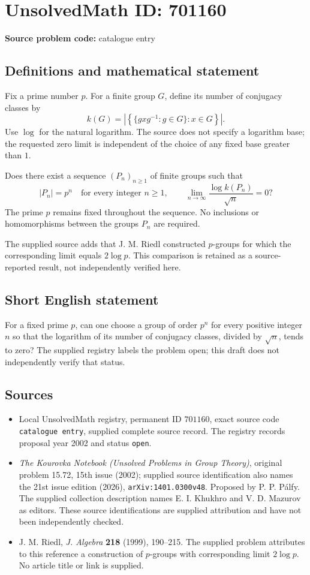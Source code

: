 \documentclass[11pt]{article}
\begin{document}
\section*{UnsolvedMath ID: 701160}
\textbf{Source problem code:} catalogue entry
\subsection{Definitions and mathematical statement}
Fix a prime number \(p\). For a finite group \(G\), define its number of conjugacy classes by
\[
k(G)=\left|\left\{\{gxg^{-1}:g\in G\}:x\in G\right\}\right|.
\]
Use \(\log\) for the natural logarithm. The source does not specify a logarithm base; the requested zero limit is independent of the choice of any fixed base greater than \(1\).

Does there exist a sequence \((P_n)_{n\geq 1}\) of finite groups such that
\[
|P_n|=p^n\quad\text{for every integer }n\geq 1,
\qquad
\lim_{n\to\infty}\frac{\log k(P_n)}{\sqrt n}=0?
\]
The prime \(p\) remains fixed throughout the sequence. No inclusions or homomorphisms between the groups \(P_n\) are required.

The supplied source adds that J. M. Riedl constructed \(p\)-groups for which the corresponding limit equals \(2\log p\). This comparison is retained as a source-reported result, not independently verified here.
\subsection{Short English statement}
For a fixed prime \(p\), can one choose a group of order \(p^n\) for every positive integer \(n\) so that the logarithm of its number of conjugacy classes, divided by \(\sqrt n\), tends to zero? The supplied registry labels the problem open; this draft does not independently verify that status.
\subsection{Sources}
\begin{itemize}
\item Local UnsolvedMath registry, permanent ID \(701160\), exact source code \texttt{catalogue entry}, supplied complete source record. The registry records proposal year 2002 and status \texttt{open}.
\item \emph{The Kourovka Notebook (Unsolved Problems in Group Theory)}, original problem 15.72, 15th issue (2002); supplied source identification also names the 21st issue edition (2026), \texttt{arXiv:1401.0300v48}. Proposed by P. P. P\'alfy. The supplied collection description names E. I. Khukhro and V. D. Mazurov as editors. These source identifications are supplied attribution and have not been independently checked.
\item J. M. Riedl, \emph{J. Algebra} \textbf{218} (1999), 190--215. The supplied problem attributes to this reference a construction of \(p\)-groups with corresponding limit \(2\log p\). No article title or link is supplied.
\end{itemize}
\end{document}
